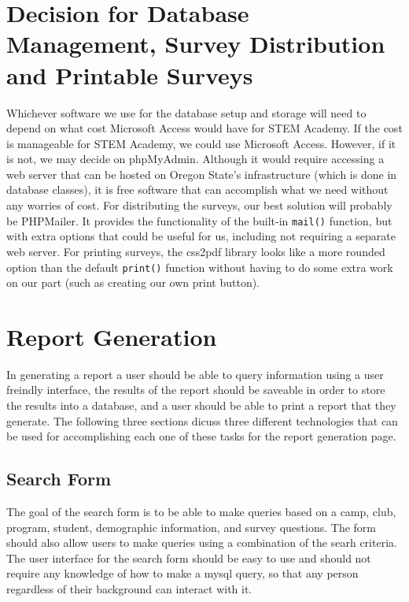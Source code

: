 \documentclass[letterpaper,10pt,serif, draftclsnofoot,onecolumn, compsoc, titlepage]{IEEEtran}
\begin{document}
\section{Decision for Database Management, Survey Distribution and Printable Surveys}
Whichever software we use for the database setup and storage will need to depend on what cost Microsoft Access would have for STEM Academy.
If the cost is manageable for STEM Academy, we could use Microsoft Access.
However, if it is not, we may decide on phpMyAdmin.
Although it would require accessing a web server that can be hosted on Oregon State's infrastructure (which is done in database classes), it is free software that can accomplish what we need without any worries of cost.
For distributing the surveys, our best solution will probably be PHPMailer.
It provides the functionality of the built-in \texttt{mail()} function, but with extra options that could be useful for us, including not requiring a separate web server.
For printing surveys, the css2pdf library looks like a more rounded option than the default \texttt{print()} function without having to do some extra work on our part (such as creating our own print button). 




\section{Report Generation}
In generating a report a user should be able to query information using a user freindly interface, the results of the report should be saveable in order to store the results into a database, and a user should be able to print a report that they generate. The following three sections dicuss three different technologies that can be used for accomplishing each one of these tasks for the report generation page.  
\subsection{Search Form}
The goal of the search form is to be able to make queries based on a camp, club, program, student, demographic information, and survey questions. The form should also allow users to make queries using a combination of the searh criteria. The user interface for the search form should be easy to use and should not require any knowledge of how to make a mysql query, so that any person regardless of their background can interact with it. 

\end{document}
